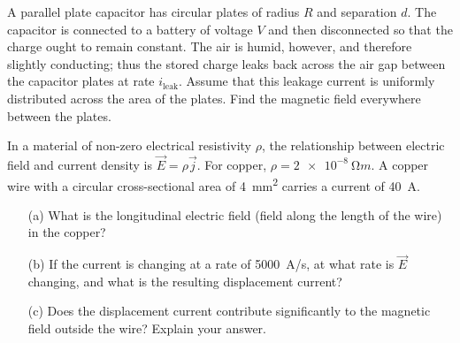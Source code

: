 \documentclass[12pt,letterpaper,boxed,cm]{hmcpset}
\begin{document}

\begin{problem}[SUP1]
A parallel plate capacitor has circular plates of radius $R$ and separation $d$. The capacitor is connected to a battery of voltage $V$ and then disconnected so that the charge ought to remain constant. The air is humid, however, and therefore slightly conducting; thus the stored charge leaks back across the air gap between the capacitor plates at rate $i_\text{leak}$. Assume that this leakage current is uniformly distributed across the area of the plates. Find the magnetic field everywhere between the plates. 	
\end{problem}
\begin{solution}
\end{solution}
\newpage


\begin{problem}[SUP2]
In a material of non-zero electrical resistivity $\rho$, the relationship between electric field and current density is $\vec{E} = \rho\vec{j}$. For copper, $\rho = \SI{2e-8}{\ohm m}$. A copper wire with a circular cross-sectional area of \SI{4}{mm^2} carries a current of \SI{40}{A}.
\begin{enumerate}
	\item[(a)] What is the longitudinal electric field (field along the length of the wire) in the copper?
	\item[(b)] If the current is changing at a rate of \SI{5000}{A/s}, at what rate is $\vec{E}$ changing, and what is the resulting displacement current?
	\item[(c)] Does the displacement current contribute significantly to the magnetic field outside the wire? Explain your answer.	
\end{enumerate}
\end{problem}
\begin{solution}
\end{solution}
\newpage
\end{document}
